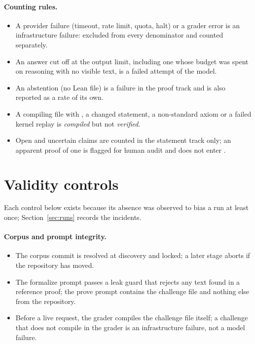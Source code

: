 \documentclass[11pt,a4paper]{article}
\begin{document}
\paragraph{Counting rules.}
\begin{itemize}
\item A provider failure (timeout, rate limit, quota, halt) or a grader error is an infrastructure failure: excluded from every denominator and counted separately.
\item An answer cut off at the output limit, including one whose budget was spent on reasoning with no visible text, is a failed attempt of the model.
\item An abstention (no Lean file) is a failure in the proof track and is also reported as a rate of its own.
\item A compiling file with , a changed statement, a non-standard axiom or a failed kernel replay is \emph{compiled} but not \emph{verified}.
\item Open and uncertain claims are counted in the statement track only; an apparent proof of one is flagged  for human audit and does not enter .
\end{itemize}

\section{Validity controls}
\label{sec:controls}

Each control below exists because its absence was observed to bias a run at least once; Section~\ref{sec:runs} records the incidents.

\paragraph{Corpus and prompt integrity.}
\begin{itemize}
\item The corpus commit is resolved at discovery and locked; a later stage aborts if the repository has moved.
\item The formalize prompt passes a leak guard that rejects any text found in a reference proof; the prove prompt contains the challenge file and nothing else from the repository.
\item Before a live request, the grader compiles the challenge file itself; a challenge that does not compile in the grader is an infrastructure failure, not a model failure.
\end{itemize}
\end{document}
